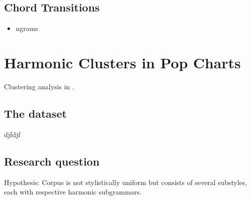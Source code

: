 \documentclass[letterpaper,10pt,english]{sphinxmanual}
\begin{document}


\section{Chord Transitions}
\label{\detokenize{beethoven_harmony:chord-transitions}}\begin{itemize}
\item {} 
n\sphinxhyphen{}grams

\end{itemize}


\chapter{Harmonic Clusters in Pop Charts}
\label{\detokenize{billboard:harmonic-clusters-in-pop-charts}}\label{\detokenize{billboard::doc}}

Clustering analysis in .

\begin{sphinxVerbatim}[commandchars=\\\{\}]
    
           
    
\end{sphinxVerbatim}


\section{The dataset}
\label{\detokenize{billboard:the-dataset}}
djfdjf


\section{Research question}
\label{\detokenize{billboard:research-question}}
Hypothesis: Corpus is not stylistically uniform but consists of several sub\sphinxhyphen{}styles,
each with respective harmonic sub\sphinxhyphen{}grammars.
\end{document}
